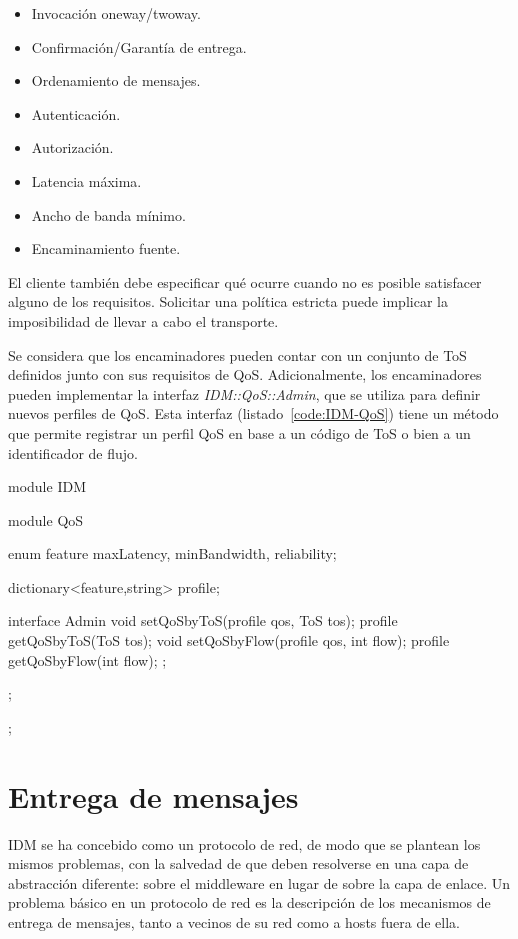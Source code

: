 \documentclass{arco-article}
\newcommand{\iface}[1]{\textit{#1}}
\def \mw {middleware}
\begin{document}
\begin{itemize}
\item Invocación oneway/twoway.
\item Confirmación/Garantía de entrega.
\item Ordenamiento de mensajes.
\item Autenticación.
\item Autorización.
\item Latencia máxima.
\item Ancho de banda mínimo.
\item Encaminamiento fuente.
\end{itemize}

El cliente también debe especificar qué ocurre cuando no es posible
satisfacer alguno de los requisitos. Solicitar una política estricta
puede implicar la imposibilidad de llevar a cabo el transporte.

Se considera que los encaminadores pueden contar con un conjunto de
\ac{ToS} definidos junto con sus requisitos de
\ac{QoS}. Adicionalmente, los encaminadores pueden implementar la
interfaz \iface{IDM::QoS::Admin}, que se utiliza para definir nuevos
perfiles de \ac{QoS}. Esta interfaz (listado~\ref{code:IDM-QoS}) tiene
un método que permite registrar un perfil \ac{QoS} en base a un código
de \ac{ToS} o bien a un identificador de flujo.

\begin{listing}[
  float,
  language = Slice,
  caption =  {Interfaz para administración de perfiles de \acs{QoS} en
              encaminadores \acs{IDM}},
  label =    code:IDM-QoS]
module IDM {
  module QoS {
    enum feature {maxLatency,
                  minBandwidth,
                  reliability};

    dictionary<feature,string> profile;

    interface Admin {
      void setQoSbyToS(profile qos, ToS tos);
      profile getQoSbyToS(ToS tos);
      void setQoSbyFlow(profile qos, int flow);
      profile getQoSbyFlow(int flow);
    };
  };
};
\end{listing}


\section{Entrega de mensajes}

\ac{IDM} se ha concebido como un protocolo de red, de modo que se
plantean los mismos problemas, con la salvedad de que deben resolverse
en una capa de abstracción diferente: sobre el \mw{} en lugar de sobre
la capa de enlace. Un problema básico en un protocolo de red es la
descripción de los mecanismos de entrega de mensajes, tanto a vecinos
de su red como a hosts fuera de ella.
\end{document}
